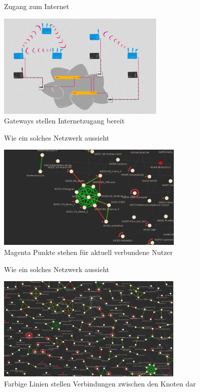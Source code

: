 \documentclass[10pt]{beamer}
\begin{document}
  \begin{frame}{Zugang zum Internet}
    \begin{center}
      \includegraphics[height=5cm]{images/network_5}\\
      \vspace{1em}
      Gateways stellen Internetzugang bereit
      \vspace{1em}
    \end{center}
  \end{frame}

  \begin{frame}{Wie ein solches Netzwerk aussieht}
    \begin{center}
      \includegraphics[height=5cm]{images/mesh_small}\\
      \vspace{1em}
      Magenta Punkte stehen für aktuell verbundene Nutzer
      \vspace{1em}
    \end{center}
  \end{frame}

  \begin{frame}{Wie ein solches Netzwerk aussieht}
    \begin{center}
      \includegraphics[height=5cm]{images/mesh_medium}\\
      \vspace{1em}
      Farbige Linien stellen Verbindungen zwischen den Knoten dar
      \vspace{1em}
    \end{center}
  \end{frame}
\end{document}
